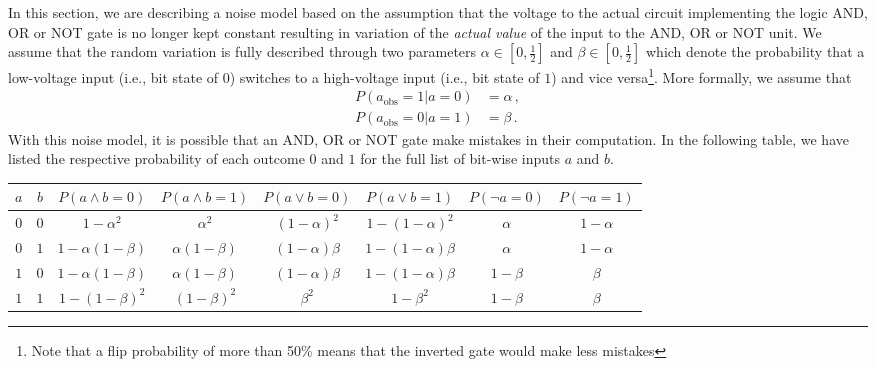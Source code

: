 \label{sec:noisy_adders}
In this section, we are describing a noise model based on the assumption that the voltage to the actual circuit implementing the logic AND, OR or NOT gate is no longer kept constant resulting in variation of the {\em actual value} of the input to the AND, OR or NOT unit. We assume that the random variation is fully described through two parameters $\alpha \in \left[0,\frac{1}{2}\right]$ and $\beta \in \left[0,\frac{1}{2}\right]$ which denote the probability that a low-voltage input (i.e., bit state of $0$) switches to a high-voltage input (i.e., bit state of $1$) and vice versa\footnote{Note that a flip probability of more than 50\% means that the inverted gate would make less mistakes}. More formally, we assume that
\begin{align}
    P(a_\text{obs} = 1 | a = 0) & = \alpha\,, \label{eq:bit_flip_to_1} \\
    P(a_\text{obs} = 0 | a = 1) & = \beta\,. \label{eq:bit_flip_to_0}
\end{align}
With this noise model, it is possible that an AND, OR or NOT gate make mistakes in their computation. In the following table, we have listed the respective probability of each outcome $0$ and $1$ for the full list of bit-wise inputs $a$ and $b$.

\begin{center}
    \begin{tabular}{c|c||c|c||c|c||c|c}
        $a$                            & $b$                            &
        $P\left(a \land b = 0\right)$  & $P\left(a \land b = 1\right)$  &
        $P\left(a \lor b = 0\right)$   & $P\left(a \lor b = 1\right)$   &
        $P\left(\neg a = 0\right)$     & $P\left(\neg a = 1\right)$       \\
        \hline
        $0$                            & $0$                            &
        $1-\alpha^2$                   & $\alpha^2$                     &
        $\left(1-\alpha\right)^2$      & $1-\left(1-\alpha\right)^2$    &
        $\alpha$                       & $1-\alpha$                       \\
        $0$                            & $1$                            &
        $1-\alpha\left(1-\beta\right)$ & $\alpha\left(1-\beta\right)$   &
        $\left(1-\alpha\right)\beta$   & $1-\left(1-\alpha\right)\beta$ &
        $\alpha$                       & $1-\alpha$                       \\
        $1$                            & $0$                            &
        $1-\alpha\left(1-\beta\right)$ & $\alpha\left(1-\beta\right)$   &
        $\left(1-\alpha\right)\beta$   & $1-\left(1-\alpha\right)\beta$ &
        $1-\beta$                      & $\beta$                          \\
        $1$                            & $1$                            &
        $1-\left(1-\beta\right)^2$     & $\left(1-\beta\right)^2$       &
        $\beta^2$                      & $1-\beta^2$                    &
        $1-\beta$                      & $\beta$                          \\
    \end{tabular}
\end{center}

